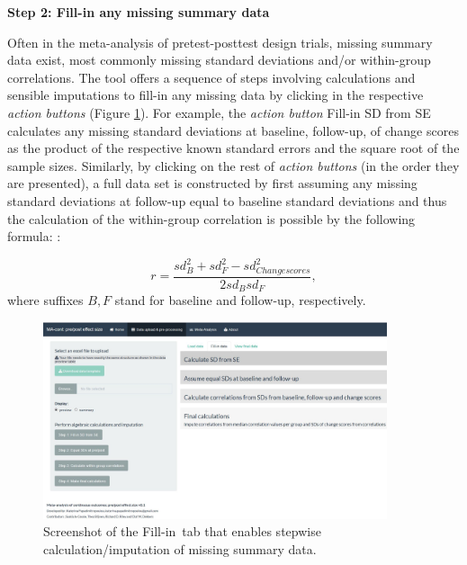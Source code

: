 \documentclass[AMA,STIX1COL]{WileyNJD-v2}
\begin{document}
\vspace{0.1cm}

\textbf{Step 2: Fill-in any missing summary data}
\vspace{0.1cm}

Often in the meta-analysis of pretest-posttest design trials, missing summary data exist, most commonly missing standard deviations and/or within-group correlations. The tool offers a sequence of steps involving calculations and sensible imputations to fill-in any missing data by clicking in the respective \textit{action buttons} (Figure \ref{fig:shiny_missing}). For example, the \textit{action button} \textquotesingle Fill-in SD from SE\textquotesingle\, calculates any missing standard deviations at baseline, follow-up, of change scores as the product of the respective known standard errors and the square root of the sample sizes.
Similarly, by clicking on the rest of \textit{action buttons} (in the order they are presented), a full data set is constructed by first assuming any missing standard deviations at follow-up equal to baseline standard deviations and thus the calculation of the within-group correlation is possible by the following formula: \citep{higgins2011chapter}:

\begin{equation*}
r = \frac{sd^2_{B}+sd^2_{F} - sd^2_{Changescores}}{2sd_{B}sd_{F}},
\end{equation*}
where suffixes $B, F$ stand for baseline and follow-up, respectively.

\begin{figure}[t]
   \centering \includegraphics[width=0.9\textwidth]{fill_empty.JPG}
    \caption{\small {Screenshot of the \textquotesingle Fill-in\textquotesingle\ tab that enables stepwise calculation/imputation of missing summary data.}} \label{fig:shiny_missing}
\end{figure}
\end{document}
